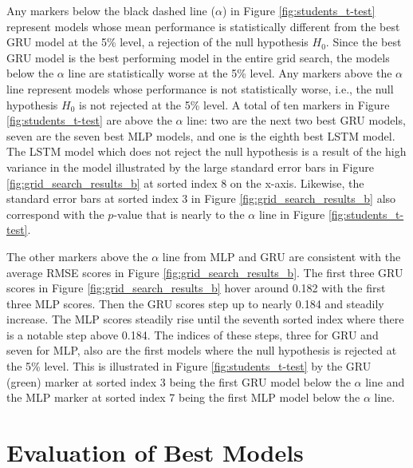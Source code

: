 Any markers below the black dashed line ($\alpha$) in Figure \ref{fig:students_t-test} represent models whose mean performance is statistically different from the best GRU model at the 5\% level, a rejection of the null hypothesis $H_{0}$. Since the best GRU model is the best performing model in the entire grid search, the models below the $\alpha$ line are statistically worse at the 5\% level. Any markers above the $\alpha$ line represent models whose performance is not statistically worse, i.e., the null hypothesis $H_{0}$ is not rejected at the 5\% level. A total of ten markers in Figure \ref{fig:students_t-test} are above the $\alpha$ line: two are the next two best GRU models, seven are the seven best MLP models, and one is the eighth best LSTM model. The LSTM model which does not reject the null hypothesis is a result of the high variance in the model illustrated by the large standard error bars in Figure \ref{fig:grid_search_results_b} at sorted index 8 on the x-axis. Likewise, the standard error bars at sorted index 3 in Figure \ref{fig:grid_search_results_b} also correspond with the $p$-value that is nearly to the $\alpha$ line in Figure \ref{fig:students_t-test}.

The other markers above the $\alpha$ line from MLP and GRU are consistent with the average RMSE scores in Figure \ref{fig:grid_search_results_b}. The first three GRU scores in Figure \ref{fig:grid_search_results_b} hover around 0.182 with the first three MLP scores. Then the GRU scores step up to nearly 0.184 and steadily increase. The MLP scores steadily rise until the seventh sorted index where there is a notable step above 0.184. The indices of these steps, three for GRU and seven for MLP, also are the first models where the null hypothesis is rejected at the 5\% level. This is illustrated in Figure \ref{fig:students_t-test} by the GRU (green) marker at sorted index 3 being the first GRU model below the $\alpha$ line and the MLP marker at sorted index 7 being the first MLP model below the $\alpha$ line.

\section{Evaluation of Best Models}
